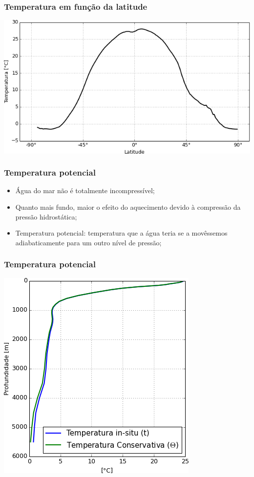 \begin{frame}
\frametitle{Temperatura em função da latitude}
    \begin{center}
        \includegraphics[scale=0.55]{./figures/latitudinal_temperature_woa09.png}
    \end{center}
\end{frame}

\begin{frame}
\frametitle{Temperatura potencial}
    \small{
    \begin{itemize}[<+-| alert@+>]
    \item Água do mar não é totalmente incompressível;
    \item Quanto mais fundo, maior o efeito do aquecimento devido à compressão
          da pressão hidrostática;
    \item Temperatura potencial: temperatura que a água teria se a movêssemos
          adiabaticamente para um outro nível de pressão;
    \end{itemize}
    }
\end{frame}

\begin{frame}
\frametitle{Temperatura potencial}
    \begin{center}
        \includegraphics[scale=0.5]{./figures/profile_temperature_woa09.png}
    \end{center}
\end{frame}

